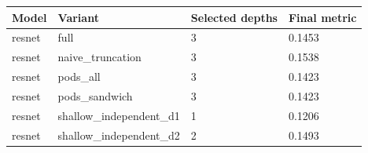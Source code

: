 \begin{tabular}{llll}
\hline
Model & Variant & Selected depths & Final metric \\
\hline
resnet & full & 3 & 0.1453 \\
resnet & naive\_truncation & 3 & 0.1538 \\
resnet & pods\_all & 3 & 0.1423 \\
resnet & pods\_sandwich & 3 & 0.1423 \\
resnet & shallow\_independent\_d1 & 1 & 0.1206 \\
resnet & shallow\_independent\_d2 & 2 & 0.1493 \\
\hline
\end{tabular}
